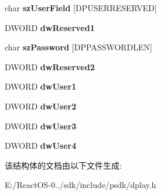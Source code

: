 \begin{DoxyCompactItemize}
char {\bfseries sz\+User\+Field} \mbox{[}D\+P\+U\+S\+E\+R\+R\+E\+S\+E\+R\+V\+ED\mbox{]}
\item 
\mbox{\label{structtag_d_p_s_e_s_s_i_o_n_d_e_s_c_afb3964f55bd7ef63824b3f0b386493f2}} 
D\+W\+O\+RD {\bfseries dw\+Reserved1}
\item 
\mbox{\label{structtag_d_p_s_e_s_s_i_o_n_d_e_s_c_aa178c64adcef9c01a9e63944d8ca2304}} 
char {\bfseries sz\+Password} \mbox{[}D\+P\+P\+A\+S\+S\+W\+O\+R\+D\+L\+EN\mbox{]}
\item 
\mbox{\label{structtag_d_p_s_e_s_s_i_o_n_d_e_s_c_afa07db384ac01ae45e45394e5d3c637d}} 
D\+W\+O\+RD {\bfseries dw\+Reserved2}
\item 
\mbox{\label{structtag_d_p_s_e_s_s_i_o_n_d_e_s_c_ab45f9093a1f00a4258838b4bc34c9e99}} 
D\+W\+O\+RD {\bfseries dw\+User1}
\item 
\mbox{\label{structtag_d_p_s_e_s_s_i_o_n_d_e_s_c_a48cb926fe186e4d08ee745eae381a028}} 
D\+W\+O\+RD {\bfseries dw\+User2}
\item 
\mbox{\label{structtag_d_p_s_e_s_s_i_o_n_d_e_s_c_a5704548cf3671e76a854af0d172cc0af}} 
D\+W\+O\+RD {\bfseries dw\+User3}
\item 
\mbox{\label{structtag_d_p_s_e_s_s_i_o_n_d_e_s_c_a7cef4e555e0c65d1d2e6750ace051477}} 
D\+W\+O\+RD {\bfseries dw\+User4}
\end{DoxyCompactItemize}


该结构体的文档由以下文件生成\+:\begin{DoxyCompactItemize}
\item 
E\+:/\+React\+O\+S-\/0../sdk/include/psdk/dplay.\+h\end{DoxyCompactItemize}
